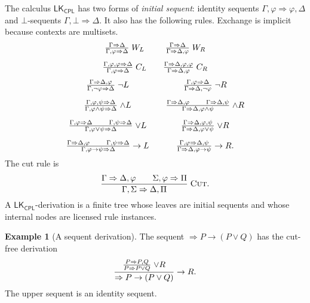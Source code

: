 \documentclass[11pt,oneside,openany]{book}
\theoremstyle{definition}
\newtheorem{example}[definition]{Example}
\theoremstyle{plain}
\theoremstyle{remark}
\newcommand{\bottom}{\bot}
\newcommand{\LK}{\mathsf{LK}}
\newcommand{\CPL}{\mathsf{CPL}}
\newcommand{\Rule}[3][]{\frac{#2}{#3}\;\textsc{#1}}
\begin{document}
The calculus \(\LK_{\CPL}\) has two forms of \emph{initial sequent}:
identity sequents \(\Gamma,\varphi\Rightarrow\varphi,\Delta\) and
\(\bottom\)-sequents \(\Gamma,\bottom\Rightarrow\Delta\).  It also has
the following rules.  Exchange is
implicit because contexts are multisets.
\[
\begin{array}{c@{\qquad}c}
\Rule[\(W_L\)]{\Gamma\Rightarrow\Delta}{\Gamma,\varphi\Rightarrow\Delta}
&
\Rule[\(W_R\)]{\Gamma\Rightarrow\Delta}{\Gamma\Rightarrow\Delta,\varphi}
\\[2.4ex]
\Rule[\(C_L\)]{\Gamma,\varphi,\varphi\Rightarrow\Delta}
 {\Gamma,\varphi\Rightarrow\Delta}
&
\Rule[\(C_R\)]{\Gamma\Rightarrow\Delta,\varphi,\varphi}
 {\Gamma\Rightarrow\Delta,\varphi}
\end{array}
\]
\[
\begin{array}{c@{\qquad}c}
\Rule[\(\neg L\)]{\Gamma\Rightarrow\Delta,\varphi}
 {\Gamma,\neg\varphi\Rightarrow\Delta}
&
\Rule[\(\neg R\)]{\Gamma,\varphi\Rightarrow\Delta}
 {\Gamma\Rightarrow\Delta,\neg\varphi}
\\[2.6ex]
\Rule[\(\land L\)]{\Gamma,\varphi,\psi\Rightarrow\Delta}
 {\Gamma,\varphi\land\psi\Rightarrow\Delta}
&
\Rule[\(\land R\)]{
 \Gamma\Rightarrow\Delta,\varphi\qquad
 \Gamma\Rightarrow\Delta,\psi}
 {\Gamma\Rightarrow\Delta,\varphi\land\psi}
\\[2.6ex]
\Rule[\(\lor L\)]{
 \Gamma,\varphi\Rightarrow\Delta\qquad
 \Gamma,\psi\Rightarrow\Delta}
 {\Gamma,\varphi\lor\psi\Rightarrow\Delta}
&
\Rule[\(\lor R\)]{\Gamma\Rightarrow\Delta,\varphi,\psi}
 {\Gamma\Rightarrow\Delta,\varphi\lor\psi}
\\[2.6ex]
\Rule[\(\to L\)]{
 \Gamma\Rightarrow\Delta,\varphi\qquad
 \Gamma,\psi\Rightarrow\Delta}
 {\Gamma,\varphi\to\psi\Rightarrow\Delta}
&
\Rule[\(\to R\)]{\Gamma,\varphi\Rightarrow\Delta,\psi}
 {\Gamma\Rightarrow\Delta,\varphi\to\psi}.
\end{array}
\]
The cut rule is
\[
 \Rule[Cut]{\Gamma\Rightarrow\Delta,\varphi\qquad
             \Sigma,\varphi\Rightarrow\Pi}
            {\Gamma,\Sigma\Rightarrow\Delta,\Pi}.
\]
A \(\LK_{\CPL}\)-derivation is a finite tree whose leaves are initial
sequents and whose internal nodes are licensed rule instances.

\begin{example}[A sequent derivation]
The sequent \(\Rightarrow P\to(P\lor Q)\) has the cut-free derivation
\[
 \Rule[\(\to R\)]{
   \Rule[\(\lor R\)]{P\Rightarrow P,Q}{P\Rightarrow P\lor Q}}
  {\Rightarrow P\to(P\lor Q)}.
\]
The upper sequent is an identity sequent.
\end{example}
\end{document}

